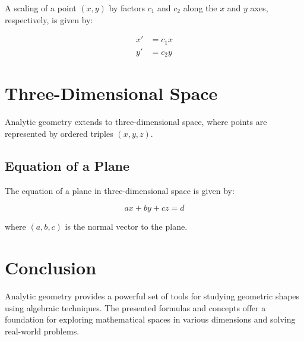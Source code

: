 \documentclass{article}
\begin{document}
A scaling of a point $(x, y)$ by factors $c_1$ and $c_2$ along the $x$ and $y$ axes, respectively, is given by:

\begin{align}
    x' &= c_1 x \\
    y' &= c_2 y
\end{align}

\section{Three-Dimensional Space}

Analytic geometry extends to three-dimensional space, where points are represented by ordered triples $(x, y, z)$.

\subsection{Equation of a Plane}

The equation of a plane in three-dimensional space is given by:

\begin{equation}
    ax + by + cz = d
\end{equation}

where $(a, b, c)$ is the normal vector to the plane.

\section{Conclusion}

Analytic geometry provides a powerful set of tools for studying geometric shapes using algebraic techniques. The presented formulas and concepts offer a foundation for exploring mathematical spaces in various dimensions and solving real-world problems.
\end{document}
